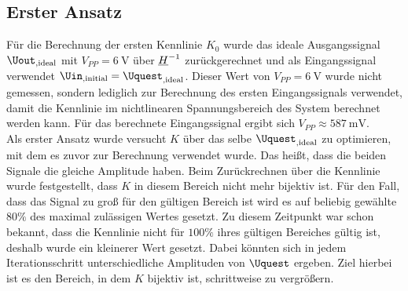 \documentclass[../Report.tex]{subfiles}
\begin{document}
\subsection{Erster Ansatz}
\label{subsec:opt.adjusta.results}
Für die Berechnung der ersten Kennlinie $K_0$ wurde das ideale Ausgangssignal $\Uout_{, \mathrm{ideal}}$ mit $V_{PP} = \SI{6}{\V}$ über $\underline{H}^{-1}$ zurückgerechnet und als Eingangssignal verwendet $\Uin_{, \mathrm{initial }} = \Uquest_{, \mathrm{ideal}}$. Dieser Wert von $V_{PP} = \SI{6}{\V}$ wurde nicht gemessen, sondern lediglich zur Berechnung des ersten Eingangssignals verwendet, damit die Kennlinie im nichtlinearen Spannungsbereich des System berechnet werden kann. Für das berechnete Eingangssignal ergibt sich $V_{PP} \approx \SI{587}{\mV}$.\\
Als erster Ansatz wurde versucht $K$ über das selbe $\Uquest_{, \mathrm{ideal}}$ zu optimieren, mit dem es zuvor zur Berechnung verwendet wurde. Das heißt, dass die beiden Signale die gleiche Amplitude haben. Beim Zurückrechnen über die Kennlinie wurde festgestellt, dass $K$ in diesem Bereich nicht mehr bijektiv ist. Für den Fall, dass das Signal zu groß für den gültigen Bereich ist wird es auf beliebig gewählte $80\%$ des maximal zulässigen Wertes gesetzt. Zu diesem Zeitpunkt war schon bekannt, dass die Kennlinie nicht für $100\%$ ihres gültigen Bereiches gültig ist, deshalb wurde ein kleinerer Wert gesetzt. Dabei könnten sich in jedem Iterationsschritt unterschiedliche Amplituden von $\Uquest$ ergeben. Ziel hierbei ist es den Bereich, in dem $K$ bijektiv ist, schrittweise zu vergrößern.
\end{document}
